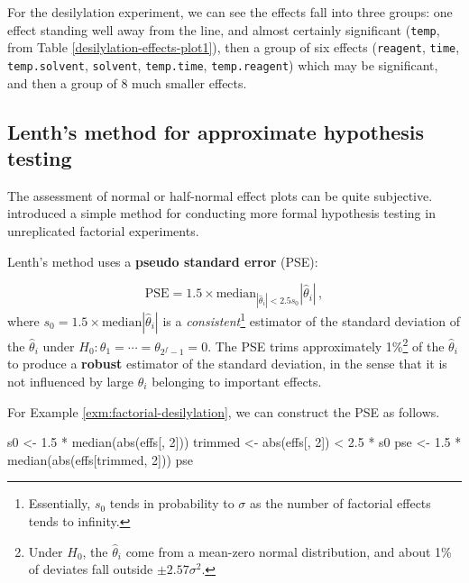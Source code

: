 \documentclass[
]{book}
\newenvironment{Shaded}{\begin{snugshade}}{\end{snugshade}}
\newcommand{\DecValTok}[1]{\textcolor[rgb]{0.00,0.00,0.81}{#1}}
\newcommand{\FloatTok}[1]{\textcolor[rgb]{0.00,0.00,0.81}{#1}}
\newcommand{\FunctionTok}[1]{\textcolor[rgb]{0.00,0.00,0.00}{#1}}
\newcommand{\NormalTok}[1]{#1}
\newcommand{\OtherTok}[1]{\textcolor[rgb]{0.56,0.35,0.01}{#1}}
\newcommand{\SpecialCharTok}[1]{\textcolor[rgb]{0.00,0.00,0.00}{#1}}
\theoremstyle{definition}
\theoremstyle{definition}
\theoremstyle{definition}
\theoremstyle{definition}
\theoremstyle{remark}
\begin{document}
For the desilylation experiment, we can see the effects fall into three groups: one effect standing well away from the line, and almost certainly significant (\texttt{temp}, from Table \ref{desilylation-effects-plot1}), then a group of six effects (\texttt{reagent}, \texttt{time}, \texttt{temp.solvent}, \texttt{solvent}, \texttt{temp.time}, \texttt{temp.reagent}) which may be significant, and then a group of 8 much smaller effects.

\hypertarget{lenths-method-for-approximate-hypothesis-testing}{%
\subsection{Lenth's method for approximate hypothesis testing}\label{lenths-method-for-approximate-hypothesis-testing}}

The assessment of normal or half-normal effect plots can be quite subjective. \citet{Lenth1989} introduced a simple method for conducting more formal hypothesis testing in unreplicated factorial experiments.

Lenth's method uses a \textbf{pseudo standard error} (PSE):

\[
\mbox{PSE} = 1.5 \times \mbox{median}_{|\hat{\theta}_i| < 2.5s_0}|\hat{\theta}_i|\,,
\]
where \(s_0 = 1.5\times \mbox{median} |\hat{\theta}_i|\) is a \emph{consistent}\footnote{Essentially, \(s_0\) tends in probability to \(\sigma\) as the number of factorial effects tends to infinity.} estimator of the standard deviation of the \(\hat{\theta}_i\) under \(H_0: \theta_1 = \cdots=\theta_{2^f-1}=0\). The PSE trims approximately 1\%\footnote{Under \(H_0\), the \(\hat{\theta}_i\) come from a mean-zero normal distribution, and about 1\% of deviates fall outside \(\pm 2.57\sigma^2\).} of the \(\hat{\theta}_i\) to produce a \textbf{robust} estimator of the standard deviation, in the sense that it is not influenced by large \(\hat{\theta}_i\) belonging to important effects.

For Example \ref{exm:factorial-desilylation}, we can construct the PSE as follows.

\begin{Shaded}
\begin{Highlighting}[]
\NormalTok{s0 }\OtherTok{\textless{}{-}} \FloatTok{1.5} \SpecialCharTok{*} \FunctionTok{median}\NormalTok{(}\FunctionTok{abs}\NormalTok{(effs[, }\DecValTok{2}\NormalTok{]))}
\NormalTok{trimmed }\OtherTok{\textless{}{-}} \FunctionTok{abs}\NormalTok{(effs[, }\DecValTok{2}\NormalTok{]) }\SpecialCharTok{\textless{}} \FloatTok{2.5} \SpecialCharTok{*}\NormalTok{ s0}
\NormalTok{pse }\OtherTok{\textless{}{-}} \FloatTok{1.5} \SpecialCharTok{*} \FunctionTok{median}\NormalTok{(}\FunctionTok{abs}\NormalTok{(effs[trimmed, }\DecValTok{2}\NormalTok{]))}
\NormalTok{pse}
\end{Highlighting}
\end{Shaded}
\end{document}

